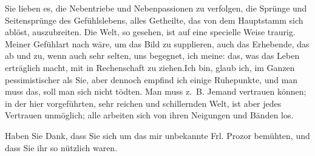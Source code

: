 \pstart
           Sie lieben es, die Nebentriebe und Nebenpassionen zu verfolgen, die Sprünge und
               Seitensprünge des Gefühlslebens, alles Getheilte, das von dem Hauptstamm sich ablöst,
               auszubreiten. Die Welt, so gesehen, ist auf eine specielle Weise traurig. Meiner
               Gefühlart nach wäre, um das Bild zu supplieren, auch das Erhebende, das ab und zu,
               wenn auch sehr selten, uns begegnet, ich meine: das, was das Leben erträglich macht,
                   mit in Rechenschaft zu ziehen.\hspace*{2em}Ich bin, glaub ich, im Ganzen pessimistischer als Sie,
               aber dennoch empfind ich einige Ruhepunkte, und man muss das, soll man sich nicht
               tödten. Man muss z. B. Jemand vertrauen können; {\pb}in der hier vorgeführten, sehr
               reichen und schillernden Welt, ist aber jedes Vertrauen unmöglich; alle arbeiten sich
               von ihren Neigungen und Bänden los.\pend
           
\pstart
           Haben Sie Dank, dass Sie sich um das mir unbekannte Frl. Prozor bemühten, und dass Sie ihr so nützlich waren.\pend
           
